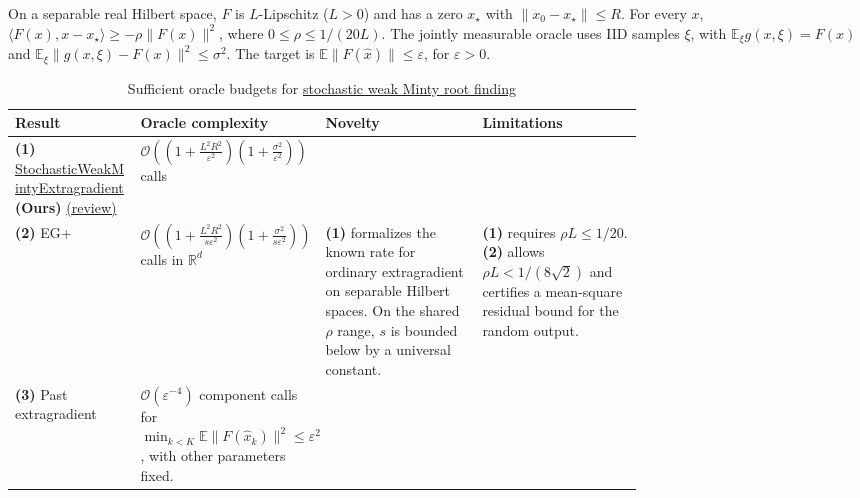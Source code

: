 \begin{table}[tp]
\centering
\caption{Sufficient oracle budgets for \href{https://github.com/k3nfalt/longtails/blob/main/LongTails/Setups/StochasticWeakMinty.lean}{stochastic weak Minty root finding}}\label{tab:StochasticWeakMinty}
\parbox{\linewidth}{\footnotesize On a separable real Hilbert space, $F$ is $L$-Lipschitz ($L>0$) and has a zero $x_\star$ with $\|x_0-x_\star\|\le R$. For every $x$, $\langle F(x),x-x_\star\rangle\ge-\rho\|F(x)\|^2$, where $0\le\rho\le 1/(20L)$. The jointly measurable oracle uses IID samples $\xi$, with $\mathbb E_\xi g(x,\xi)=F(x)$ and $\mathbb E_\xi\|g(x,\xi)-F(x)\|^2\le\sigma^2$. The target is $\mathbb E\|F(\hat x)\|\le\varepsilon$, for $\varepsilon>0$.}\par\smallskip
\begin{threeparttable}
\footnotesize
\setlength{\tabcolsep}{4pt}\renewcommand{\arraystretch}{1.25}
\begin{tabularx}{\linewidth}{@{}>{\raggedright\arraybackslash}p{0.20\linewidth}>{\raggedright\arraybackslash}p{0.28\linewidth}>{\raggedright\arraybackslash}p{0.25\linewidth}>{\raggedright\arraybackslash}X@{}}
\toprule
\textbf{Result} & \textbf{Oracle complexity} & \textbf{Novelty} & \textbf{Limitations} \\
\midrule
\textbf{(1)} \href{https://github.com/k3nfalt/longtails/blob/main/LongTails/Theorems/StochasticWeakMintyExtragradient.lean}{Stochastic\allowbreak Weak\allowbreak Minty\allowbreak Extragradient} \textbf{(Ours)} \href{https://github.com/k3nfalt/longtails/blob/main/scripts/reviews/StochasticWeakMintyExtragradient.md}{(review)}
& $\mathcal{O}\!\left(\left(1+\frac{L^2R^2}{\varepsilon^2}\right)\left(1+\frac{\sigma^2}{\varepsilon^2}\right)\right)$ calls & & \\
\midrule[1.2pt]
\textbf{(2)} EG+ \citep[Thm.~4.5(i)]{newmDDJ2021v2}
& $\mathcal{O}\!\left(\left(1+\frac{L^2R^2}{s\varepsilon^2}\right)\left(1+\frac{\sigma^2}{s\varepsilon^2}\right)\right)$ calls in $\mathbb R^d$
& \textbf{(1)} formalizes the known rate for ordinary extragradient on separable Hilbert spaces. On the shared $\rho$ range, $s$ is bounded below by a universal constant.
& \textbf{(1)} requires $\rho L\le 1/20$. \textbf{(2)} allows $\rho L<1/(8\sqrt2)$ and certifies a mean-square residual bound for the random output. \\
\midrule
\textbf{(3)} Past extragradient \citep[Thm.~4.5]{swmCGL2023}
& $\mathcal{O}(\varepsilon^{-4})$ component calls for $\min_{k<K}\mathbb E\|F(\hat x_k)\|^2\le\varepsilon^2$, with other parameters fixed.

\end{tabularx}
\end{threeparttable}
\end{table}
